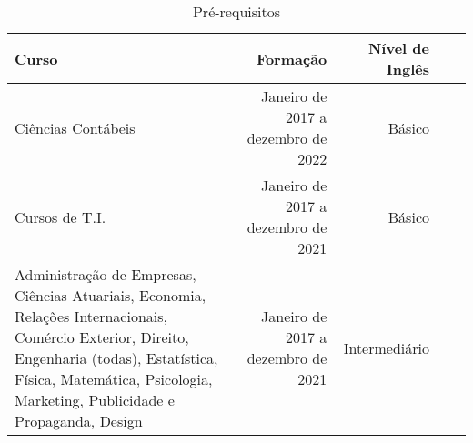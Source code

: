 \begin{table}[htb]
\centering
\caption{Pré-requisitos}
\label{tab-exemplo}
\begin{tabular}{p{2.8cm}|r|r|r|r}
    \hline
   \textbf{Curso} & \textbf{Formação}  & \textbf{Nível de Inglês} \\
    \hline
    Ciências Contábeis & Janeiro de 2017 a dezembro de 2022 & Básico  \\
    \hline
    Cursos de T.I. & Janeiro de 2017 a dezembro de 2021  & Básico \\
    \hline
    Administração de Empresas, Ciências Atuariais, Economia, Relações Internacionais, Comércio Exterior, Direito, Engenharia (todas), Estatística, Física, Matemática, Psicologia, Marketing, Publicidade e Propaganda, Design & Janeiro de 2017 a dezembro de 2021  & Intermediário \\
    \hline
\end{tabular}
\end{table}